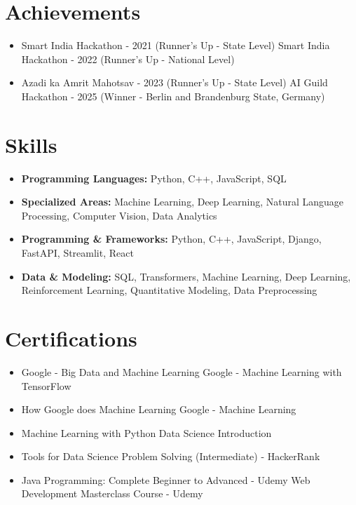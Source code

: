 \documentclass[a4paper,10pt]{article}
\begin{document}
\section*{Achievements}
\begin{itemize}
\item Smart India Hackathon - 2021 (Runner's Up - State Level) \hfill Smart India Hackathon - 2022 (Runner's Up - National Level)
\item Azadi ka Amrit Mahotsav - 2023 (Runner's Up - State Level) \hfill AI Guild Hackathon - 2025 (Winner - Berlin and Brandenburg State, Germany)
\end{itemize}

\section*{Skills}
\begin{itemize}
  \item \textbf{Programming Languages:} Python, C++, JavaScript, SQL
  \item \textbf{Specialized Areas:} Machine Learning, Deep Learning, Natural Language Processing, Computer Vision, Data Analytics
  \item \textbf{Programming \& Frameworks:} Python, C++, JavaScript, Django, FastAPI, Streamlit, React
  \item \textbf{Data \& Modeling:} SQL, Transformers, Machine Learning, Deep Learning, Reinforcement Learning, Quantitative Modeling, Data Preprocessing
\end{itemize}

\section*{Certifications}
\begin{itemize}
\item Google - Big Data and Machine Learning \hfill Google - Machine Learning with TensorFlow
\item How Google does Machine Learning \hfill Google - Machine Learning
\item Machine Learning with Python \hfill Data Science Introduction
\item Tools for Data Science \hfill Problem Solving (Intermediate) - HackerRank
\item Java Programming: Complete Beginner to Advanced - Udemy \hfill Web Development Masterclass Course - Udemy
\end{itemize}
\end{document}
